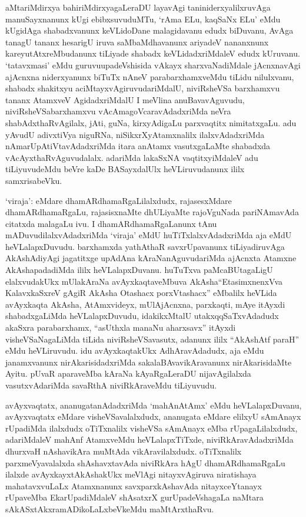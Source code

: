 
\begin{artha}
aMtariMdirxya bahiriMdirxyagaLeraDU layavAgi taniniderxyalilxruvAga manuSayxnanunx kUgi ebibxsuvuduMTu, `rAma ELu, kaqSaNx ELu' eMdu kUgidAga shabadxvanunx keVLidoDane malagidavanu edudx biDuvanu, AvAga tanagU tananx hesarigU iruva saMbaMdhavanunx ariyadeV nananxnunx kareyutAtxreMbudanunx tiLiyade shabadx keVLidadxriMdaleV edudx kUruvanu. `tatavxmasi' eMdu guruvu\break upadeVshisida vAkayx sharxvaNadiMdale jAcnxnavAgi ajAcnxna niderxyanunx biTuTx nAneV parabarxhamxveMdu tiLidu nilulxvanu, shabadx shakitxyu aciMtayxvAgiruvudariMdalU, niviRsheVSa barxhamxvu tananx AtamxveV AgidadxriMdalU I meVlina anuBavavAguvudu, niviRsheVSabarxhamxvu vAcAmagoVcaravAdadxriMda neVra shabAdxthaRvAgilalx, jAti, guNa, kirxyAdigaLu parxvaqtitx nimitatxgaLu. adu yAvudU adivxtiVya niguRNa, niSikxrXyAtamxnalilx ilalxvAdadxriMda nAmarUpAtiVtavAdadxriMda itara anAtamx vasutxgaLaMte shabadxda vAcAyxthaRvAguvudalalx. adariMda lakaSxNA vaqtitxyiMdaleV adu tiLiyuvudeMdu beVre kaDe BASayxdalUlx heVLiruvudanunx ililx samxrisabeVku. 

`viraja': eMdare dhamARdhamaRgaLilalxdudx, rajasesxMdare dhamARdhamaRgaLu, rajasisxnaMte dhULiyaMte rajoVguNada pariNAmavAda citatxda malagaLu ivu. I dhamARdhamaRgaLanunx tAnu mADuvudilalxvAdadxriMda `viraja' eMdU huTiTxlalxvAdadxriMda aja eMdU heVLalapxDuvudu. barxhamxda yathAthaR savxrUpavanunx tiLiyadiruvAga AkAshAdiyAgi jagatitxge upAdAna kAraNanAguvudariMda ajAcnxta Atamxne AkAshapadadiMda ililx heVLalapxDuvanu. huTuTxva paMcaBUtagaLigU elalxvudakUkx mUlakAraNa avAyxkaqtaveMbuva AkAsha\break ``EtasimxnenxVva KalavxkaSxreV gAgiR AkAsha Otashacx porxVtashacx'' eMbalilx heVLida avAyxkaqta AkAsha, AtAmxvideyx, mUlAjAcnxna, parxkaqti, mAye itAyxdi shabadxgaLiMda heVLalapxDuvudu, idakikxMtalU utakxqqSaTxvAdadudx akaSxra parabarxhamx, ``asUthxla manaNu aharxsavx'' itAyxdi visheVSaNagaLiMda tiLida niviRsheVSavasutx, adanunx ililx ``AkAshAtf paraH'' eMdu heVLiruvudu. idu avAyxkaqtakUkx AdhAravAdadudx, aja eMdu janamxvanunx nirAkarisidadxriMda sakalaBAvavikAravanunx nirAkarisidaMte Ayitu. pUvaR aparaveMba kAraNa kAyaRgaLeraDU nijavAgilalxda vasutxvAdariMda savaRthA niviRkAraveMdu tiLiyuvudu.

avAyxvaqtatx, ananugatanAdadxriMda `mahAnAtAmx' eMdu heVLalapxDuvanu, avAyxvaqtatx eMdare visheVSavalalxdudx, ananugata eMdare elilxyU sAmAnayx rUpadiMda ilalxdudx oTiTxnalilx visheVSa sAmAnayx eMba rUpagaLilalxdudx, adariMdaleV mahAnf AtamxveMdu heVLalapxTiTxde, niviRkAravAdadxriMda dhurxvaH nAshavikAra muMtAda vikAravilalxdudx. oTiTxnalilx parxmeVyavalalxda shAshavxtavAda niviRkAra hAgU dhamARdhamaRgaLu ilalxde avAyxkayxtAkAshakUkx meVlAgi nitayxvAgiruva niratishaya mahatavxvuLaLx Atamxnanunx savxparxkAshavAda nitayxceYtanayx rUpaveMba EkarUpadiMdaleV shAsatxrX gurUpadeVshagaLa naMtara sAkASxtAkxramADikoLaLxbeVkeMdu maMtArxthaRvu.
\end{artha}

